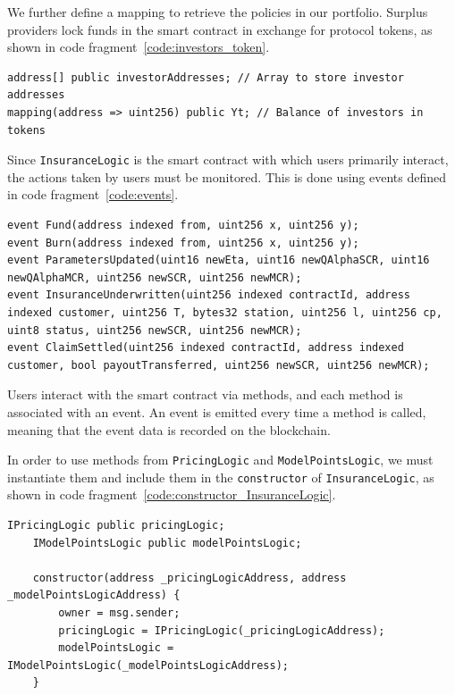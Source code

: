 \documentclass[10pt]{article}
\begin{document}
We further define a mapping to retrieve the policies in our portfolio. Surplus providers lock funds in the smart contract in exchange for protocol tokens, as shown in code fragment~\ref{code:investors_token}.


\begin{codefragment}[!h]
\begin{lstlisting}[language=Solidity]
address[] public investorAddresses; // Array to store investor addresses
mapping(address => uint256) public Yt; // Balance of investors in tokens

\end{lstlisting}
    \caption{Array of \texttt{investorAddresses} and token holding}
    \label{code:investors_token}
\end{codefragment}

Since \texttt{InsuranceLogic} is the smart contract with which users primarily interact, the actions taken by users must be monitored. This is done using events defined in code fragment~\ref{code:events}.


\begin{codefragment}[!h]
\begin{lstlisting}[language=Solidity]
event Fund(address indexed from, uint256 x, uint256 y);
event Burn(address indexed from, uint256 x, uint256 y);
event ParametersUpdated(uint16 newEta, uint16 newQAlphaSCR, uint16 newQAlphaMCR, uint256 newSCR, uint256 newMCR);
event InsuranceUnderwritten(uint256 indexed contractId, address indexed customer, uint256 T, bytes32 station, uint256 l, uint256 cp, uint8 status, uint256 newSCR, uint256 newMCR); 
event ClaimSettled(uint256 indexed contractId, address indexed customer, bool payoutTransferred, uint256 newSCR, uint256 newMCR);
\end{lstlisting}
    \caption{Event definition of \texttt{InsuranceLogic}}
    \label{code:events}
\end{codefragment}

Users interact with the smart contract via methods, and each method is associated with an event. An event is emitted every time a method is called, meaning that the event data is recorded on the blockchain.

In order to use methods from \texttt{PricingLogic} and \texttt{ModelPointsLogic}, we must instantiate them and include them in the \texttt{constructor} of \texttt{InsuranceLogic}, as shown in code fragment~\ref{code:constructor_InsuranceLogic}.


\begin{codefragment}[!h]
\begin{lstlisting}[language=Solidity]
IPricingLogic public pricingLogic;
    IModelPointsLogic public modelPointsLogic;

    constructor(address _pricingLogicAddress, address _modelPointsLogicAddress) {
        owner = msg.sender;
        pricingLogic = IPricingLogic(_pricingLogicAddress);
        modelPointsLogic = IModelPointsLogic(_modelPointsLogicAddress);
    }

    \end{lstlisting}
    \caption{Constructor of \texttt{InsuranceLogic}}
    \label{code:constructor_InsuranceLogic}
\end{codefragment}
\end{document}

